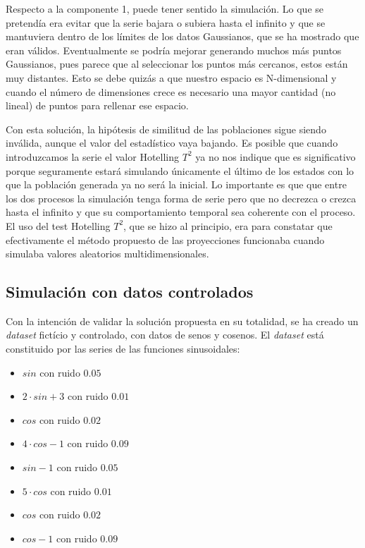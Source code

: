 \documentclass[11pt,spanish,listoffigures,listoftables]{tfgetsinf}
\begin{document}
        Respecto a la componente 1, puede tener sentido la simulación. Lo que se pretendía era evitar que la serie bajara o subiera hasta el infinito y que se mantuviera dentro de los límites de los datos Gaussianos, que se ha mostrado que eran válidos. Eventualmente se podría mejorar generando muchos más puntos Gaussianos, pues parece que al seleccionar los puntos más cercanos, estos están muy distantes. Esto se debe quizás a que nuestro espacio es N-dimensional y cuando el número de dimensiones crece es necesario una mayor cantidad (no lineal) de puntos para rellenar ese espacio.

        Con esta solución, la hipótesis de similitud de las poblaciones sigue siendo inválida, aunque el valor del estadístico vaya bajando. Es posible que cuando introduzcamos la serie el valor Hotelling \(T^2\) ya no nos indique que es significativo porque seguramente estará simulando únicamente el último de los estados con lo que la población generada ya no será la inicial. Lo importante es que que entre los dos procesos la simulación tenga forma de serie pero que no decrezca o crezca hasta el infinito y que su comportamiento temporal sea coherente con el proceso. El uso del test Hotelling \(T^2\), que se hizo al principio, era para constatar que efectivamente el método propuesto de las proyecciones funcionaba cuando simulaba valores aleatorios multidimensionales. 

	\subsection{Simulación con datos controlados}
	Con la intención de validar la solución propuesta en su totalidad, se ha creado un {\em dataset} fictício y controlado, con datos de senos y cosenos. El {\em dataset} está constituido por las series de las funciones sinusoidales:
	\begin{itemize}
            \item \(sin\) con ruido \(0.05\)
            \item \(2\cdot sin + 3\) con ruido \(0.01\)
            \item \(cos\) con ruido \(0.02\)
            \item \(4\cdot cos-1\) con ruido \(0.09\)
            \item \(sin - 1\) con ruido \(0.05\)
            \item \(5\cdot cos\) con ruido \(0.01\)
            \item \(cos\) con ruido \(0.02\)
            \item \(cos - 1\) con ruido \(0.09\)
	\end{itemize}
	
\end{document}
